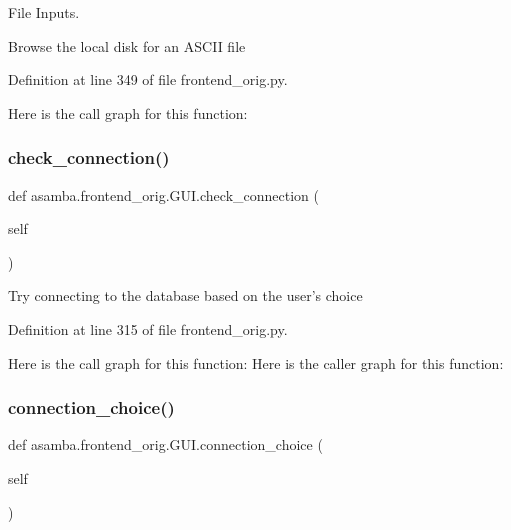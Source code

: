 File Inputs. 

\begin{DoxyVerb}Browse the local disk for an ASCII file \end{DoxyVerb}
 

Definition at line 349 of file frontend\+\_\+orig.\+py.

Here is the call graph for this function\+:
\mbox{\label{classasamba_1_1frontend__orig_1_1_g_u_i_ae71ecf0efcb575059e181ccd33f75178}} 
\subsubsection{\texorpdfstring{check\+\_\+connection()}{check\_connection()}}
{\footnotesize\ttfamily def asamba.\+frontend\+\_\+orig.\+G\+U\+I.\+check\+\_\+connection (\begin{DoxyParamCaption}\item[{}]{self }\end{DoxyParamCaption})}

\begin{DoxyVerb}Try connecting to the database based on the user's choice \end{DoxyVerb}
 

Definition at line 315 of file frontend\+\_\+orig.\+py.

Here is the call graph for this function\+:
Here is the caller graph for this function\+:
\mbox{\label{classasamba_1_1frontend__orig_1_1_g_u_i_af3fdec98d1b3657658a5f489b2246c34}} 
\subsubsection{\texorpdfstring{connection\+\_\+choice()}{connection\_choice()}}
{\footnotesize\ttfamily def asamba.\+frontend\+\_\+orig.\+G\+U\+I.\+connection\+\_\+choice (\begin{DoxyParamCaption}\item[{}]{self }\end{DoxyParamCaption})}



